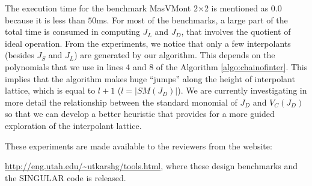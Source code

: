 \par The execution time for the benchmark MasVMont 2$\times$2 is
mentioned as $0.0$ because it is less than $50$ms. For most of the
benchmarks, a large part of the total time is consumed in computing $J_L$
and $J_D$, that involves the quotient of ideal operation. 
From the experiments, we notice that only a few interpolants (besides
$J_S$ and $J_L$) are generated by our algorithm. This depends on the
polynomials that we use in lines 4 and 8 of the Algorithm  
\ref{algo:chainofinter}. 
This implies that the algorithm makes huge ``jumps'' along the height
of interpolant lattice, which is equal 
to $l+1$ ($l=|SM(J_D)|$). We are currently investigating in more
detail the relationship between the standard monomial of $J_D$ and
$V_C(J_D)$ so that we can develop a better heuristic that provides
for a more guided exploration of the interpolant lattice. 

These experiments are made available to the reviewers from the
website:

\url{http://eng.utah.edu/\~utkarshg/tools.html}, where these design
benchmarks and the SINGULAR code is released.


